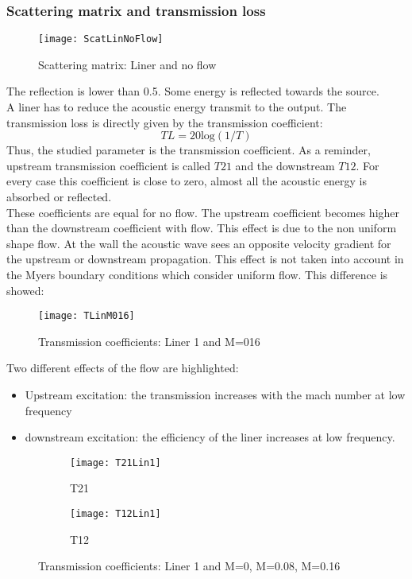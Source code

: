 \subsubsection{Scattering matrix and transmission loss}
\begin{figure}[H] \centering
    \texttt{[image: ScatLinNoFlow]}
    \caption{Scattering matrix: Liner and no flow}
\end{figure}
The reflection is lower than 0.5. Some energy is reflected towards the source.\\
A liner has to reduce the acoustic energy transmit to the output.
The transmission loss is directly given by the transmission coefficient:
\begin{equation}
    TL=20\text{log}(1/T)
\end{equation}
Thus, the studied parameter is the transmission coefficient. As a reminder, upstream transmission coefficient is called $T21$ and the downstream $T12$. For every case this coefficient is close to zero, almost all the acoustic energy is absorbed or reflected.\\
These coefficients are equal for no flow. The upstream coefficient becomes higher than the downstream coefficient with flow. This effect is due to the non uniform shape flow. At the wall the acoustic wave sees an opposite velocity gradient for the upstream or downstream propagation. This effect is not taken into account in the Myers boundary conditions which consider uniform flow. This difference is showed: 
\begin{figure}[H] \centering
    \texttt{[image: TLinM016]}
    \caption{Transmission coefficients: Liner 1 and M=016}
\end{figure}
\clearpage
Two different effects of the flow are highlighted:
\begin{itemize}
    \item Upstream excitation: the transmission increases with the mach number at low frequency
    \item downstream excitation: the efficiency of the liner increases at low frequency.
\end{itemize}
\begin{figure}[H] \centering
    \begin{subfigure}{.5\textwidth}\centering
     \texttt{[image: T21Lin1]}
    \caption{T21}
    \end{subfigure}%
    \begin{subfigure}{.5\textwidth}\centering
     \texttt{[image: T12Lin1]}
    \caption{T12}
    \end{subfigure}
    \caption{Transmission coefficients: Liner 1 and M=0, M=0.08, M=0.16}
\end{figure}
